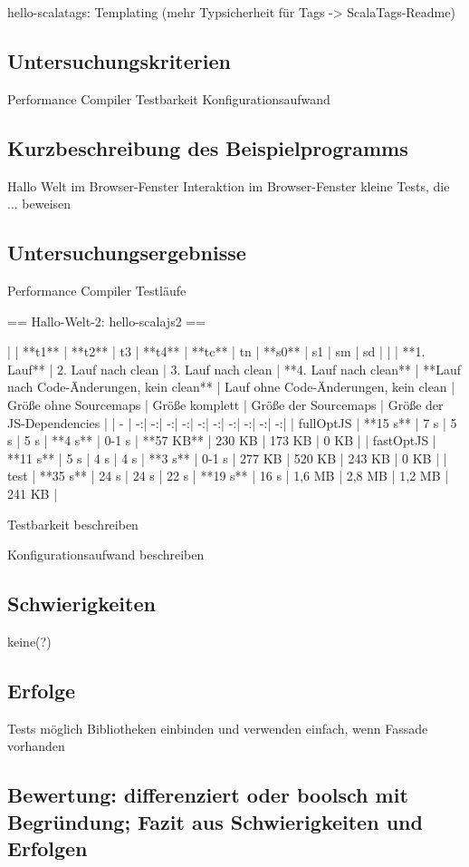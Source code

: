 \documentclass[a4paper, 12pt, listof=totoc, bibliography=totoc]{scrreprt}
\begin{document}
hello-scalatags:
Templating (mehr Typsicherheit für Tags -> ScalaTags-Readme)
\subsection{Untersuchungskriterien}
Performance
	Compiler
Testbarkeit
Konfigurationsaufwand
\subsection{Kurzbeschreibung des Beispielprogramms}
Hallo Welt im Browser-Fenster
Interaktion im Browser-Fenster
kleine Tests, die ... beweisen


\subsection{Untersuchungsergebnisse}

Performance
	Compiler
	Testläufe
	
== Hallo-Welt-2: hello-scalajs2 ==

| | **t1** | **t2** | t3 | **t4** | **tc** | tn | **s0** | s1 | sm | sd |
| | **1. Lauf** | 2. Lauf nach clean | 3. Lauf nach clean | **4. Lauf nach clean** | **Lauf nach Code-Änderungen, kein clean** | Lauf ohne Code-Änderungen, kein clean | Größe ohne Sourcemaps | Größe komplett | Größe der Sourcemaps | Größe der  JS-Dependencies |
| - | -:| -:| -:| -:| -:| -:| -:| -:| -:| -:|
| fullOptJS | **15 s** |  7 s |  5 s |  5 s |  **4 s** | 0-1 s | **57 KB** | 230 KB | 173 KB |   0 KB |
| fastOptJS | **11 s** |  5 s |  4 s |  4 s |  **3 s** | 0-1 s |  277 KB   | 520 KB | 243 KB |   0 KB |
| test      | **35 s** | 24 s | 24 s | 22 s | **19 s** |  16 s |  1,6 MB   | 2,8 MB | 1,2 MB | 241 KB |

Testbarkeit
beschreiben

Konfigurationsaufwand
beschreiben

\subsection{Schwierigkeiten}
keine(?)
\subsection{Erfolge}
Tests möglich
Bibliotheken einbinden und verwenden einfach, wenn Fassade vorhanden
\subsection{Bewertung: differenziert oder boolsch mit Begründung; Fazit aus Schwierigkeiten und Erfolgen}
\end{document}
